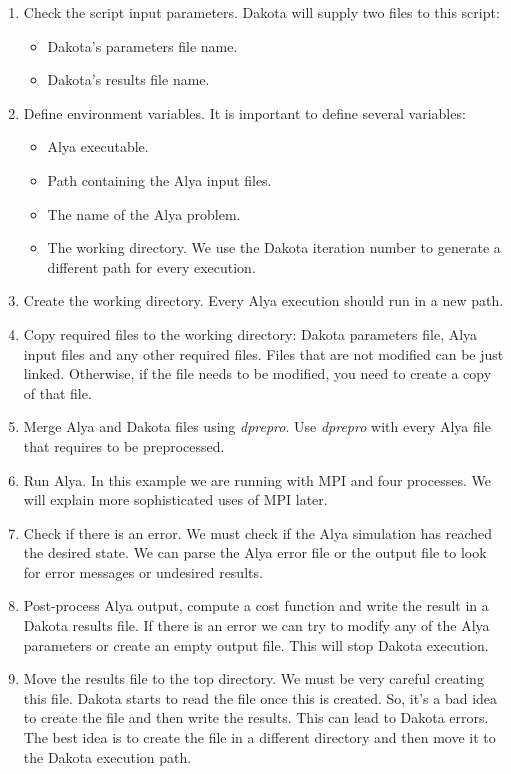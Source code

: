\documentclass[12pt,a4paper,article]{memoir}
\begin{document}
\begin{enumerate}[label=Part \arabic*:,align=right,labelwidth=2.0cm,leftmargin=2.0cm]
\item Check the script input parameters. Dakota will supply two files to this script:
\begin{itemize}
\item Dakota's parameters file name.
\item Dakota's results file name.
\end{itemize}
\item Define environment variables. It is important to define several variables:
\begin{itemize}
\item Alya executable.
\item Path containing the Alya input files.
\item The name of the Alya problem.
\item The working directory. We use the Dakota iteration number to generate a different path for every execution.
\end{itemize}
\item Create the working directory. Every Alya execution should run in a new path.
\item Copy required files to the working directory: Dakota parameters file, Alya input files and any other required files. Files that are not modified can be just linked. Otherwise, if the file needs to be modified, you need to create a copy of that file.
\item Merge Alya and Dakota files using \textit{dprepro}. Use \textit{dprepro} with every Alya file that requires to be preprocessed.
\item Run Alya. In this example we are running with MPI and four processes. We will explain more sophisticated uses of MPI later.
\item Check if there is an error. We must check if the Alya simulation has reached the desired state. We can parse the Alya error file or the output file to look for error messages or undesired results.
\item Post-process Alya output, compute a cost function and write the result in a Dakota results file. If there is an error we can try to modify any of the Alya parameters or create an empty output file. This will stop Dakota execution.
\item Move the results file to the top directory. We must be very careful creating this file. Dakota starts to read the file once this is created. So, it's a bad idea to create the file and then write the results. This can lead to Dakota errors. The best idea is to create the file in a different directory and then move it to the Dakota execution path.
\end{enumerate}
\end{document}
